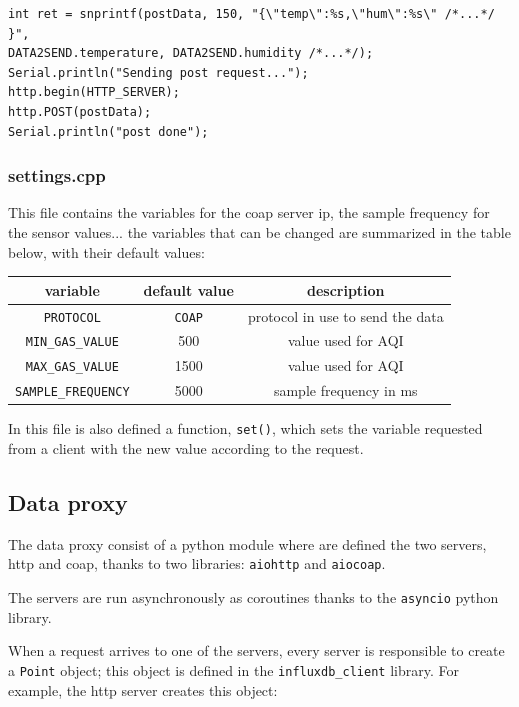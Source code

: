 \documentclass[]{article}
\begin{document}
\begin{lstlisting}[style=C++, caption=an http request contains all the data (omitted for simplicity)]
int ret = snprintf(postData, 150, "{\"temp\":%s,\"hum\":%s\" /*...*/ }",
DATA2SEND.temperature, DATA2SEND.humidity /*...*/);
Serial.println("Sending post request...");
http.begin(HTTP_SERVER);
http.POST(postData);
Serial.println("post done");
\end{lstlisting}

\subsubsection{settings.cpp}
This file contains the variables for the coap server ip, the sample frequency for the sensor values... the variables that can be changed are summarized in the table below, with their default values:

\begin{center}
	\begin{tabular}{|c|c|c|}
		\hline
		\textbf{variable} & \textbf{default value} & \textbf{description} \\
		\hline
		\texttt{PROTOCOL} & \texttt{COAP} & protocol in use to send the data \\
		\hline
		\texttt{MIN\_GAS\_VALUE} & 500 & value used for AQI \\
		\hline
		\texttt{MAX\_GAS\_VALUE} & 1500 & value used for AQI \\
		\hline
		\texttt{SAMPLE\_FREQUENCY} & 5000 & sample frequency in ms \\
		\hline
	\end{tabular}
\end{center}

In this file is also defined a function, \texttt{set()}, which sets the variable requested from a client with the new value according to the request. 

\subsection{Data proxy}

The data proxy consist of a python module where are defined the two servers, http and coap, thanks to two libraries: \texttt{aiohttp} and \texttt{aiocoap}.

The servers are run asynchronously as coroutines thanks to the \texttt{asyncio} python library. 

When a request arrives to one of the servers, every server is responsible to create a \texttt{Point} object; this object is defined in the \texttt{influxdb\_client} library. For example, the http server creates this object:
\end{document}
